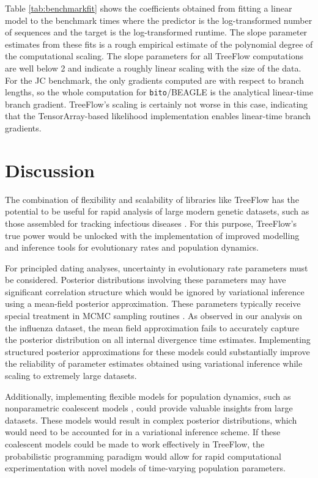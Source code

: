 Table \ref{tab:benchmarkfit} shows the coefficients obtained from fitting a linear model to the benchmark times where the predictor is the log-transformed number of sequences and the target is the log-transformed runtime. The slope parameter estimates from these fits is a rough empirical estimate of the polynomial degree of the computational scaling. The slope parameters for all TreeFlow computations are well below 2 and indicate a roughly linear scaling with the size of the data. For the JC benchmark, the only gradients computed are with respect to branch lengths, so the whole computation for \texttt{bito}/BEAGLE is the analytical linear-time branch gradient. TreeFlow's scaling is certainly not worse in this case, indicating that the TensorArray-based likelihood implementation enables linear-time branch gradients.


\section{Discussion}

The combination of flexibility and scalability of libraries like TreeFlow has the potential to be useful for rapid analysis of large modern genetic datasets, such as those assembled for tracking infectious diseases \cite{hadfield2018nextstrain}. For this purpose, TreeFlow's true power would be unlocked with the implementation of improved modelling and inference tools for evolutionary rates and population dynamics.

For principled dating analyses, uncertainty in evolutionary rate parameters must be considered. Posterior distributions involving these parameters may have significant correlation structure which would be ignored by variational inference using a mean-field posterior approximation. These parameters typically receive special treatment in MCMC sampling routines \cite{drummond2006relaxed, zhang2020improving}. As observed in our analysis on the influenza dataset, the mean field approximation fails to accurately capture the posterior distribution on all internal divergence time estimates. Implementing structured posterior approximations for these models could substantially improve the reliability of parameter estimates obtained using variational inference while scaling to extremely large datasets.

Additionally, implementing flexible models for population dynamics, such as nonparametric coalescent models \cite{drummond2005bayesian, minin2008smooth, gill2013improving}, could provide valuable insights from large datasets. These models would result in complex posterior distributions, which would need to be accounted for in a variational inference scheme. If these coalescent models could be made to work effectively in TreeFlow, the probabilistic programming paradigm would allow for rapid computational experimentation with novel models of time-varying population parameters.

